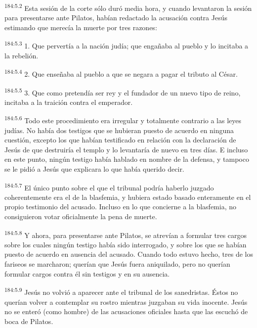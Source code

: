 \par 
\textsuperscript{184:5.2} Esta sesión de la corte sólo duró media hora, y cuando levantaron la sesión para presentarse ante Pilatos, habían redactado la acusación contra Jesús estimando que merecía la muerte por tres razones:

\par 
\textsuperscript{184:5.3} 1. Que pervertía a la nación judía; que engañaba al pueblo y lo incitaba a la rebelión.

\par 
\textsuperscript{184:5.4} 2. Que enseñaba al pueblo a que se negara a pagar el tributo al César.

\par 
\textsuperscript{184:5.5} 3. Que como pretendía ser rey y el fundador de un nuevo tipo de reino, incitaba a la traición contra el emperador.

\par 
\textsuperscript{184:5.6} Todo este procedimiento era irregular y totalmente contrario a las leyes judías. No había dos testigos que se hubieran puesto de acuerdo en ninguna cuestión, excepto los que habían testificado en relación con la declaración de Jesús de que destruiría el templo y lo levantaría de nuevo en tres días. E incluso en este punto, ningún testigo había hablado en nombre de la defensa, y tampoco se le pidió a Jesús que explicara lo que había querido decir.

\par 
\textsuperscript{184:5.7} El único punto sobre el que el tribunal podría haberlo juzgado coherentemente era el de la blasfemia, y hubiera estado basado enteramente en el propio testimonio del acusado. Incluso en lo que concierne a la blasfemia, no consiguieron votar oficialmente la pena de muerte.

\par 
\textsuperscript{184:5.8} Y ahora, para presentarse ante Pilatos, se atrevían a formular tres cargos sobre los cuales ningún testigo había sido interrogado, y sobre los que se habían puesto de acuerdo en ausencia del acusado. Cuando todo estuvo hecho, tres de los fariseos se marcharon; querían que Jesús fuera aniquilado, pero no querían formular cargos contra él sin testigos y en su ausencia.

\par 
\textsuperscript{184:5.9} Jesús no volvió a aparecer ante el tribunal de los sanedristas. Éstos no querían volver a contemplar su rostro mientras juzgaban su vida inocente. Jesús no se enteró (como hombre) de las acusaciones oficiales hasta que las escuchó de boca de Pilatos.

